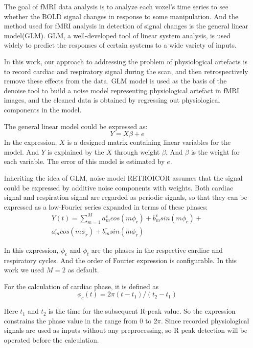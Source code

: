The goal of fMRI data analysis is to analyze each voxel's time series to see whether the BOLD signal changes in response to some manipulation. \cite{poldrack2011handbook} 
And the method used for fMRI analysis in detection of signal changes is the general linear model(GLM). 
GLM, a well-developed tool of linear system analysis, is used widely to predict the responses of certain systems to a wide variety of inputs. \cite{cohen1997parametric}

In this work, our approach to addressing the problem of physiological artefacts is to record cardiac and respiratory signal during the scan, and then retrospectively remove these effects from the data. \cite{glover2000image} 
GLM model is used as the basis of the denoise tool to build a noise model representing physiological artefact in fMRI images, and the cleaned data is obtained by regressing out physiological components in the model.

The general linear model could be expressed as:
\begin{equation}
\label{eqn:glm}
    Y = X\beta + e
\end{equation}
In the expression, $X$ is a designed matrix containing linear variables for the model. And $Y$ is explained by the $X$ through weight $\beta$. And $\beta$ is the weight for each variable. The error of this model is estimated by $e$.

Inheriting the idea of GLM, noise model RETROICOR assumes that the signal could be expressed by additive noise components with weights. Both cardiac signal and respiration signal are regarded as periodic signals, 
so that they can be expressed as a low-Fourier series expanded in terms of these phases:
\begin{multline}
    Y(t) = \sum_{m = 1}^{M} a_m^c cos(m\phi_c) + b_m^c sin(m\phi_c) + \\ a_m^r cos(m\phi_r) + b_m^r sin(m\phi_r)
\end{multline}

In this expression, $\phi_c$ and $\phi_t$ are the phases in the respective cardiac and respiratory cycles. 
And the order of Fourier expression is configurable. In this work we used $M = 2$ as default.

For the calculation of cardiac phase, it is defined as
\begin{equation}
\label{eqn:cardiac}
    \phi_c(t) = 2\pi(t-t_1)/(t_2-t_1)
\end{equation}

Here $t_1$ and $t_2$ is the time for the subsequent R-peak value. 
So the expression constrains the phase value in the range from $0$ to $2\pi$. 
Since recorded physiological signals are used as inputs without any preprocessing, so R peak detection will be operated before the calculation.

